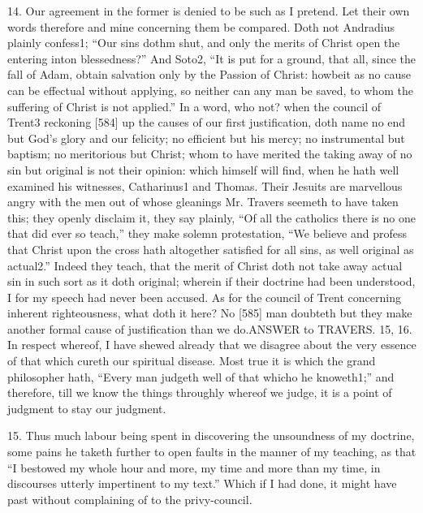 14. Our agreement in the former is denied to be such as I pretend. Let their own words therefore and mine concerning them be compared. Doth not Andradius plainly confess1; “Our sins dothm shut, and only the merits of Christ open the entering inton blessedness?” And Soto2, “It is put for a ground, that all, since the fall of Adam, obtain salvation only by the Passion of Christ: howbeit as no cause can be effectual without applying, so neither can any man be saved, to whom the suffering of Christ is not applied.” In a word, who not? when the council of Trent3 reckoning [584] up the causes of our first justification, doth name no end but God’s glory and our felicity; no efficient but his mercy; no instrumental but baptism; no meritorious but Christ; whom to have merited the taking away of no sin but original is not their opinion: which himself will find, when he hath well examined his witnesses, Catharinus1 and Thomas. Their Jesuits are marvellous angry with the men out of whose gleanings Mr. Travers seemeth to have taken this; they openly disclaim it, they say plainly, “Of all the catholics there is no one that did ever so teach,” they make solemn protestation, “We believe and profess that Christ upon the cross hath altogether satisfied for all sins, as well original as actual2.” Indeed they teach, that the merit of Christ doth not take away actual sin in such sort as it doth original; wherein if their doctrine had been understood, I for my speech had never been accused. As for the council of Trent concerning inherent righteousness, what doth it here? No [585] man doubteth but they make another formal cause of justification than we do.ANSWER to TRAVERS. 15, 16. In respect whereof, I have shewed already that we disagree about the very essence of that which cureth our spiritual disease. Most true it is which the grand philosopher hath, “Every man judgeth well of that whicho he knoweth1;” and therefore, till we know the things throughly whereof we judge, it is a point of judgment to stay our judgment.

15. Thus much labour being spent in discovering the unsoundness of my doctrine, some pains he taketh further to open faults in the manner of my teaching, as that “I bestowed my whole hour and more, my time and more than my time, in discourses utterly impertinent to my text.” Which if I had done, it might have past without complaining of to the privy-council.

